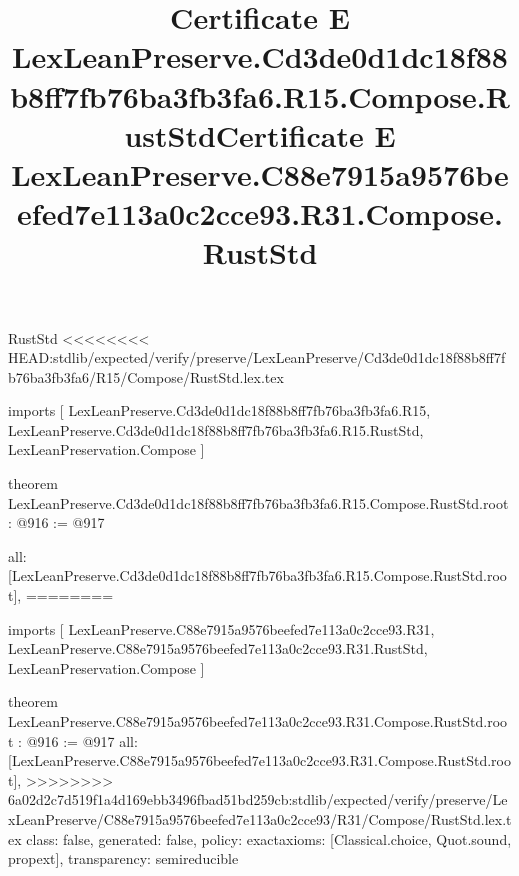 \begin{lexlean}{RustStd}
<<<<<<<< HEAD:stdlib/expected/verify/preserve/LexLeanPreserve/Cd3de0d1dc18f88b8ff7fb76ba3fb3fa6/R15/Compose/RustStd.lex.tex
\title{Certificate E LexLeanPreserve.Cd3de0d1dc18f88b8ff7fb76ba3fb3fa6.R15.Compose.RustStd}
\begin{coremodule}
imports [
  LexLeanPreserve.Cd3de0d1dc18f88b8ff7fb76ba3fb3fa6.R15,
  LexLeanPreserve.Cd3de0d1dc18f88b8ff7fb76ba3fb3fa6.R15.RustStd,
  LexLeanPreservation.Compose
]

theorem LexLeanPreserve.Cd3de0d1dc18f88b8ff7fb76ba3fb3fa6.R15.Compose.RustStd.root : @916 := @917 {
  all: [LexLeanPreserve.Cd3de0d1dc18f88b8ff7fb76ba3fb3fa6.R15.Compose.RustStd.root],
========
\title{Certificate E LexLeanPreserve.C88e7915a9576beefed7e113a0c2cce93.R31.Compose.RustStd}
\begin{coremodule}
imports [
  LexLeanPreserve.C88e7915a9576beefed7e113a0c2cce93.R31,
  LexLeanPreserve.C88e7915a9576beefed7e113a0c2cce93.R31.RustStd,
  LexLeanPreservation.Compose
]

theorem LexLeanPreserve.C88e7915a9576beefed7e113a0c2cce93.R31.Compose.RustStd.root : @916 := @917 {
  all: [LexLeanPreserve.C88e7915a9576beefed7e113a0c2cce93.R31.Compose.RustStd.root],
>>>>>>>> 6a02d2c7d519f1a4d169ebb3496fbad51bd259cb:stdlib/expected/verify/preserve/LexLeanPreserve/C88e7915a9576beefed7e113a0c2cce93/R31/Compose/RustStd.lex.tex
  class: false,
  generated: false,
  policy: exact{axioms: [Classical.choice, Quot.sound, propext]},
  transparency: semireducible
}


\end{coremodule}}
\end{coremodule}
\end{lexlean}
